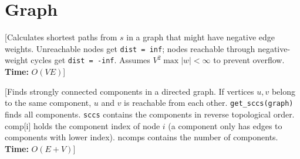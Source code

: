 \chapter{Graph}


[Calculates shortest paths from $s$ in a graph that might have negative edge weights. Unreachable nodes get \texttt{dist = inf}; nodes reachable through negative-weight cycles get \texttt{dist = -inf}. Assumes $V^2 \max |w| < \infty$ to prevent overflow. \\
\textbf{Time:} {$O(VE)$}]






[Finds strongly connected components in a directed graph. 
If vertices $u, v$ belong to the same component, $u$ and $v$ is reachable from each other.
\texttt{get\_sccs(graph)} finds all components.
\texttt{sccs} contains the components in reverse topological order. comp[i] holds the component
index of node $i$ (a component only has edges to components with lower index).
ncomps contains the number of components. \\
\textbf{Time:} {$O(E+V)$}]


